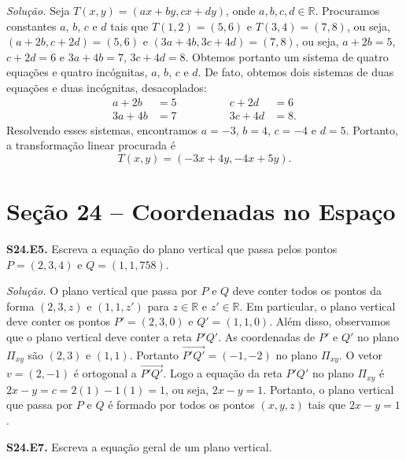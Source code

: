 \documentclass[a4paper,11pt]{article}
\newcommand{\R}{\mathbb{R}}
\begin{document}
\vspace{\baselineskip}

\emph{Solução.}
Seja $T(x,y) = (ax + by, cx + dy)$, onde $a, b, c, d \in \R$.
Procuramos constantes $a$, $b$, $c$ e $d$ tais que $T(1,2) = (5,6)$ e $T(3,4) = (7,8)$, ou seja, $(a + 2b, c + 2d) = (5,6)$ e $(3a + 4b, 3c + 4d) = (7,8)$, ou seja, $a + 2b = 5$, $c + 2d = 6$ e $3a + 4b = 7$, $3c + 4d = 8$.
Obtemos portanto um sistema de quatro equações e quatro incógnitas, $a$, $b$, $c$ e $d$.
De fato, obtemos dois sistemas de duas equações e duas incógnitas, desacoplados:
\[
  \begin{aligned}
    a + 2b & = 5 \\
    3a + 4b & = 7
  \end{aligned}
  \qquad \qquad
  \begin{aligned}
    c + 2d & = 6 \\
    3c + 4d & = 8.
  \end{aligned}
\]
Resolvendo esses sistemas, encontramos $a = -3$, $b = 4$, $c = -4$ e $d = 5$.
Portanto, a transformação linear procurada é
\[
  T(x,y) = (-3x + 4y, -4x + 5y).
\]

\section*{Seção 24 -- Coordenadas no Espaço}

\textbf{S24.E5.}
Escreva a equação do plano vertical que passa pelos pontos $P\!=\!(2,3,4)$ e $Q = (1,1,758)$.

\vspace{\baselineskip}

\emph{Solução.}
O plano vertical que passa por $P$ e $Q$ deve conter todos os pontos da forma $(2,3,z)$ e $(1,1,z')$ para $z \in \R$ e $z' \in \R$.
Em particular, o plano vertical deve conter os pontos $P' = (2,3,0)$ e $Q' = (1,1,0)$.
Além disso, observamos que o plano vertical deve conter a reta $P'Q'$.
As coordenadas de $P'$ e $Q'$ no plano $\Pi_{xy}$ são $(2,3)$ e $(1,1)$.
Portanto $\overrightarrow{P'Q'} = (-1,-2)$ no plano $\Pi_{xy}$.
O vetor $v = (2,-1)$ é ortogonal a $\overrightarrow{P'Q'}$.
Logo a equação da reta $P'Q'$ no plano $\Pi_{xy}$ é $2x - y = c = 2(1) - 1(1) = 1$, ou seja, $2x - y = 1$.
Portanto, o plano vertical que passa por $P$ e $Q$ é formado por todos os pontos $(x,y,z)$ tais que $2x - y = 1$.

\vspace{\baselineskip}

\textbf{S24.E7.}
Escreva a equação geral de um plano vertical.
\end{document}

